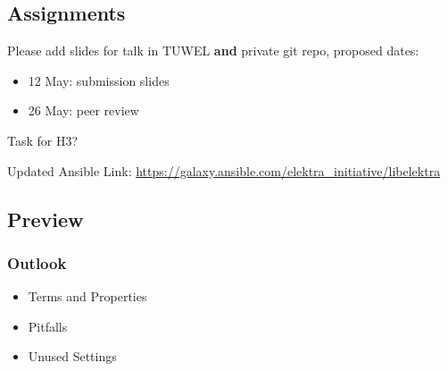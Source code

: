 \subsection{Assignments}

\begin{assignment}
	Please add slides for talk in TUWEL \textbf{and} private git repo, proposed dates:

	\begin{itemize}[<+-| alert@+>]
	\item 12 May: submission slides
	\item 26 May: peer review 
	\end{itemize}
\end{assignment}

\begin{assignment}
	Task for H3?
\end{assignment}

\begin{assignment}
	Updated Ansible Link: \url{https://galaxy.ansible.com/elektra_initiative/libelektra}
\end{assignment}

\subsection{Preview}

\begin{frame}
	\frametitle{Outlook}

	\begin{itemize} %
	\item Terms and Properties
	\item Pitfalls
	\item Unused Settings
	\end{itemize}
\end{frame}



\appendix

\begin{frame}[allowframebreaks]
	
	
\end{frame}




